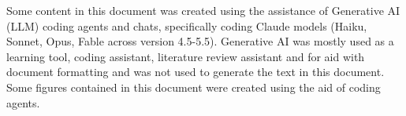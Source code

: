 \documentclass[12pt,chapterheads]{UCMerced}
\begin{document}
\begin{frontmatter}
\begin{acknowledgements}
Some content in this document was created using the assistance of Generative AI (LLM) coding agents and chats, specifically coding Claude models (Haiku, Sonnet, Opus, Fable across version 4.5-5.5). Generative AI was mostly used as a learning tool, coding assistant, literature review assistant and for aid with document formatting and was not used to generate the text in this document. Some figures contained in this document were created using the aid of coding agents.


\end{acknowledgements}




  

\end{frontmatter}
















\appendix

\end{document}
